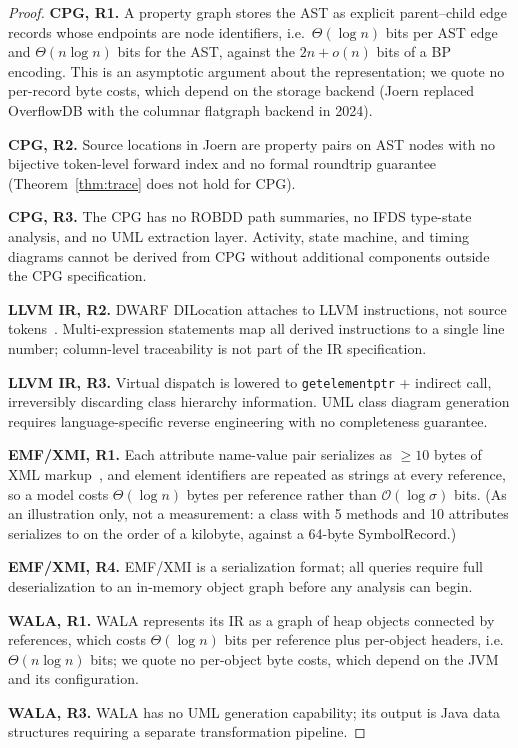 \documentclass[journal,10pt,twoside]{IEEEtran}
\newcommand{\BigO}{\mathcal{O}}
\begin{document}
\begin{proof}
\textbf{CPG, R1.}  A property graph stores the AST as
explicit parent--child edge records whose endpoints are node
identifiers, i.e.\ $\Theta(\log n)$ bits per AST edge and
$\Theta(n\log n)$ bits for the AST, against the
$2n + o(n)$ bits of a BP encoding.  This is an asymptotic
argument about the representation; we quote no per-record
byte costs, which depend on the storage backend (Joern
replaced OverflowDB with the columnar flatgraph backend in
2024).

\textbf{CPG, R2.}  Source locations in Joern are property
pairs on AST nodes with no bijective token-level forward
index and no formal roundtrip guarantee
(Theorem~\ref{thm:trace} does not hold for CPG).

\textbf{CPG, R3.}  The CPG has no ROBDD path summaries,
no IFDS type-state analysis, and no UML extraction layer.
Activity, state machine, and timing diagrams cannot be
derived from CPG without additional components outside
the CPG specification.

\textbf{LLVM IR, R2.}  DWARF DILocation attaches to LLVM
instructions, not source tokens~\cite{lattner04}.
Multi-expression statements map all derived instructions
to a single line number; column-level traceability is not
part of the IR specification.

\textbf{LLVM IR, R3.}  Virtual dispatch is lowered to
\texttt{getelementptr} + indirect call, irreversibly
discarding class hierarchy information.  UML class diagram
generation requires language-specific reverse engineering
with no completeness guarantee.

\textbf{EMF/XMI, R1.}  Each attribute name-value pair
serializes as $\ge 10$ bytes of XML markup~\cite{emf}, and
element identifiers are repeated as strings at every
reference, so a model costs $\Theta(\log n)$ bytes per
reference rather than $\BigO(\log\sigma)$ bits.  (As an
illustration only, not a measurement: a class with 5 methods
and 10 attributes serializes to on the order of a kilobyte,
against a 64-byte SymbolRecord.)

\textbf{EMF/XMI, R4.}  EMF/XMI is a serialization format;
all queries require full deserialization to an in-memory
object graph before any analysis can begin.

\textbf{WALA, R1.}  WALA represents its IR as a graph of
heap objects connected by references, which costs
$\Theta(\log n)$ bits per reference plus per-object headers,
i.e.\ $\Theta(n\log n)$ bits; we quote no per-object byte
costs, which depend on the JVM and its configuration.

\textbf{WALA, R3.}  WALA has no UML generation capability;
its output is Java data structures requiring a separate
transformation pipeline.
\end{proof}
\end{document}
